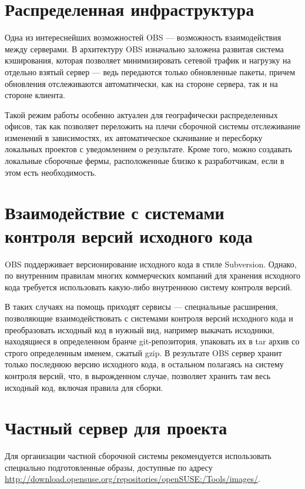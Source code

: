 \documentclass[10pt, a5paper]{article}
\begin{document}
\section*{Распределенная инфраструктура}

Одна из интереснейших возможностей OBS --- возможность взаимодействия между серверами.
В архитектуру OBS изначально заложена развитая система кэширования, которая позволяет минимизировать сетевой трафик и нагрузку на отдельно взятый сервер --- ведь передаются только обновленные пакеты, причем обновления отслеживаются автоматически, как на стороне сервера, так и на стороне клиента.

Такой режим работы особенно актуален для географически распределенных офисов, так как позволяет переложить на плечи сборочной системы отслеживание изменений в зависимостях, их автоматическое скачивание и пересборку локальных проектов с уведомлением о результате. Кроме того, можно  создавать локальные сборочные фермы, расположенные близко к разработчикам, если в этом есть необходимость.

\section*{Взаимодействие с системами контроля версий исходного кода}

OBS поддерживает версионирование исходного кода в стиле Subversion. Однако, по внутренним правилам многих коммерческих компаний для хранения исходного кода требуется использовать какую-либо внутреннюю систему контроля версий.

В таких случаях на помощь приходят сервисы --- специальные расширения, позволяющие взаимодействовать с системами контроля версий исходного кода и преобразовать исходный код в нужный вид, например выкачать исходники, находящиеся в определенном бранче git-репозитория, упаковать их в tar архив со строго определенным именем, сжатый gzip. В результате OBS сервер хранит только последнюю версию исходного кода, в остальном полагаясь на систему контроля версий, что, в вырожденном случае, позволяет хранить там весь исходный код, включая правила для сборки.

\section*{Частный сервер для проекта}

Для организации частной сборочной системы рекомендуется \cite{Pynkin2} использовать специально подготовленные образы, доступные по адресу \url{http://download.opensuse.org/repositories/openSUSE:/Tools/images/}.
\end{document}
